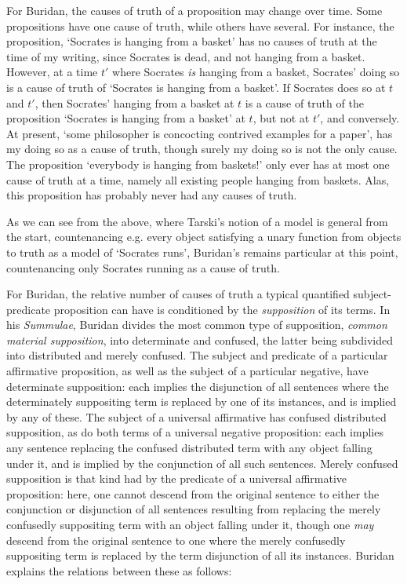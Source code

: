 \documentclass[]{article}
\begin{document}
For Buridan, the causes of truth of a proposition may change over time. Some propositions have one cause of truth, while others have several. For instance, the proposition, `Socrates is hanging from a basket' has no causes of truth at the time of my writing, since Socrates is dead, and not hanging from a basket. However, at a time $t'$ where Socrates \textit{is} hanging from a basket, Socrates' doing so is a cause of truth of `Socrates is hanging from a basket'. If Socrates does so at $t$ and $t'$, then Socrates' hanging from a basket at $t$ is a cause of truth of the proposition `Socrates is hanging from a basket' at $t$, but not at $t'$, and conversely. At present, `some philosopher is concocting contrived examples for a paper', has my doing so as a cause of truth, though surely my doing so is not the only cause. The proposition `everybody is hanging from baskets!' only ever has at most one cause of truth at a time, namely all existing people hanging from baskets. Alas, this proposition has probably never had any causes of truth.

As we can see from the above, where Tarski's notion of a model is general from the start, countenancing e.g. every object satisfying a unary function from objects to truth as a model of `Socrates runs', Buridan's remains particular at this point, countenancing only Socrates running as a cause of truth.

For Buridan, the relative number of causes of truth a typical quantified subject-predicate proposition can have is conditioned by the \textit{supposition} of its terms. In his \textit{Summulae}, Buridan divides the most common type of supposition, \textit{common material supposition}, into determinate and confused, the latter being subdivided into distributed and merely confused. The subject and predicate of a particular affirmative proposition, as well as the subject of a particular negative, have determinate supposition: each implies the disjunction of all sentences where the determinately suppositing term is replaced by one of its instances, and is implied by any of these. The subject of a universal affirmative has confused distributed supposition, as do both terms of a universal negative proposition: each implies any sentence replacing the confused distributed term with any object falling under it, and is implied by the conjunction of all such sentences. Merely confused supposition is that kind had by the predicate of a universal affirmative proposition: here, one cannot descend from the original sentence to either the conjunction or disjunction of all sentences resulting from replacing the merely confusedly suppositing term with an object falling under it, though one \textit{may} descend from the original sentence to one where the merely confusedly suppositing term is replaced by the term disjunction of all its instances. Buridan explains the relations between these as follows:
\end{document}
